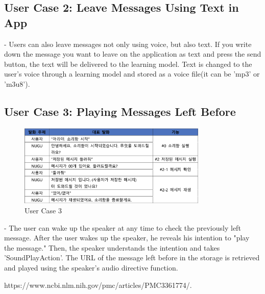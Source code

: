 \documentclass[conference]{IEEEtran}
\begin{document}
\subsection{User Case 2: Leave Messages Using Text in App}
- Users can also leave messages not only using voice, but also text. If you write down the message you want to leave on the application as text and press the send button, the text will be delivered to the learning model. Text is changed to the user's voice through a learning model and stored as a voice file(it can be 'mp3' or 'm3u8').\\

\subsection{User Case 3: Playing Messages Left Before}
\begin{figure}[ht!]
    \centerline{\includegraphics[width=9cm]{img/usecase 3.png}}
    \caption{User Case 3}
\end{figure}
- The user can wake up the speaker at any time to check the previously left message. After the user wakes up the speaker, he reveals his intention to "play the message." Then, the speaker understands the intention and takes 'SoundPlayAction'. The URL of the message left before in the storage is retrieved and played using the speaker's audio directive function.\\

\begin{thebibliography}{00}
 https://www.ncbi.nlm.nih.gov/pmc/articles/PMC3361774/.
\end{thebibliography}
\vspace{12pt}
\end{document}
